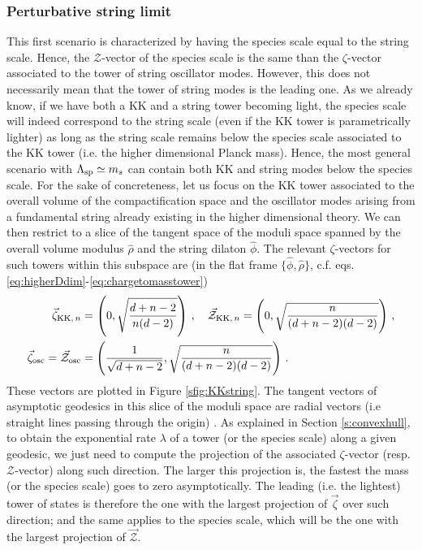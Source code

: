 	
\subsubsection*{Perturbative string limit}
	
This first scenario is characterized by having the species scale equal to the string scale. Hence, the $\mathcal{Z}$-vector of the species scale is the same than the $\zeta$-vector associated to the tower of string oscillator modes. However, this does not necessarily mean that the tower of string modes is the leading one. As we already know, if we have both a KK and a string tower becoming light, the species scale will indeed correspond to the string scale (even if the KK tower is parametrically lighter) as long as the string scale remains below the species scale associated to the KK tower (i.e. the higher dimensional Planck mass). Hence, the most general scenario with $\Lambda_{\text{sp}} \simeq m_s$ can contain both KK and string modes below the species scale. For the sake of concreteness, let us focus on the KK tower associated to the overall volume of the compactification space and the oscillator modes arising from a fundamental string already existing in the higher dimensional theory. We can then restrict to a slice of the tangent space of the moduli space spanned by the overall volume modulus $\hat{\rho}$ and the string dilaton $\hat{\phi}$. The relevant $\zeta$-vectors for such towers within this subspace are (in the flat frame $\{\hat{\phi},\hat{\rho}\}$, c.f. eqs. \eqref{eq:higherDdim}-\eqref{eq:chargetomasstower}) 
%
\begin{equation}\label{eq:zetasstringlimit}
	\begin{split} 
		\vec{\zeta}_{{\rm KK},\, n} &= \left( 0 , \sqrt{\frac{d+n-2}{n (d-2)}} \right)\, ,\quad \vec{\mathcal{Z}}_{{\rm KK},\, n} = \left( 0 , \sqrt{\frac{n}{(d+n-2) (d-2)}} \right)\, ,\\
		\vec{\zeta}_{\text{osc}}=\vec{\mathcal{Z}}_{\text{osc}} &= \left( \frac{1}{\sqrt{d+n-2}} , \sqrt{\frac{n}{(d+n-2)(d-2)}} \right)\, .
	\end{split}
\end{equation}
%
These vectors are plotted in Figure \ref{sfig:KKstring}. The tangent vectors of asymptotic geodesics in this slice of the moduli space are radial vectors (i.e straight lines passing through the origin) \cite{Etheredge:2022opl}. As explained in Section \ref{s:convexhull}, to obtain the exponential rate $\lambda$ of a tower (or the species scale) along a given geodesic, we just need to compute the projection of the associated $\zeta$-vector (resp. $\mathcal{Z}$-vector) along such direction. The larger this projection is, the fastest the mass (or the species scale) goes to zero asymptotically. The leading (i.e. the lightest) tower of states is therefore the one with the largest projection of $\vec\zeta$ over such direction; and the same applies to the species scale, which will be the one with the largest projection of $\vec{\mathcal{Z}}$.
	
